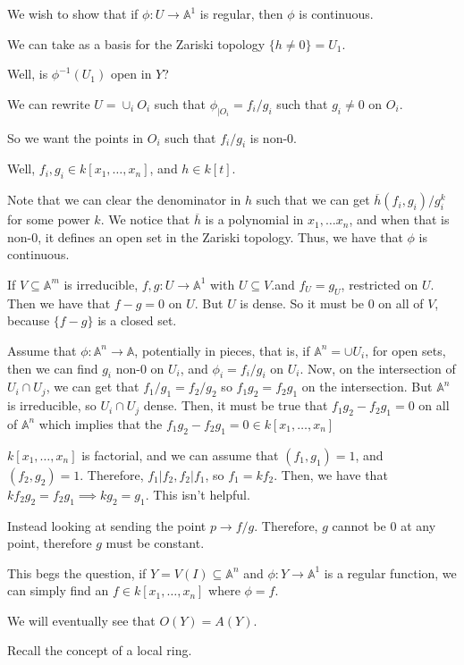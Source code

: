 \documentclass[10pt]{article}
\begin{document}
We wish to show that if $\phi: U \to \mathbb{A}^1$ is regular, then $\phi$ is continuous. 

We can take as a basis for the Zariski topology $\{ h \not = 0\} = U_1$.

Well, is $\phi^{-1}(U_1)$ open in $Y$?

We can rewrite $U = \cup_i O_i$ such that $\phi_{|O_i} = f_i/g_i$ such that $g_i \not = 0$ on $O_i$.

So we want the points in $O_i$ such that $f_i/g_i$ is non-0.

Well, $f_i,g_i \in k[x_1,…,x_n]$, and $h \in k[t]$.

Note that we can clear the denominator in $h$ such that we can get $\overline{h}(f_i,g_i)/g_i^k$ for some power $k$. We notice that $\overline{h}$ is a polynomial in $x_1,…x_n$, and when that is non-0, it defines an open set in the Zariski topology. Thus, we have that $\phi$ is continuous.

If $V \subseteq \mathbb{A}^m$ is irreducible, $f,g: U \to \mathbb{A}^1$ with $U \subseteq V$.and $f_{U} = g_{U}$, restricted on $U$. Then we have that $f-g = 0$ on $U$. But $U$ is dense. So it must be 0 on all of $V$, because $\{ f - g\}$ is a closed set.

Assume that $\phi: \mathbb{A}^n \to \mathbb{A}$, potentially in pieces, that is, if $\mathbb{A}^n = \cup U_i$, for open sets, then we can find $g_i$ non-0 on $U_i$, and $\phi_i = f_i/g_i$ on $U_i$. Now, on the intersection of $U_i \cap U_j$, we can get that $f_1/g_1 = f_2/g_2$ so $f_1g_2 = f_2g_1$ on the intersection. But $\mathbb{A}^n$ is irreducible, so $U_i \cap U_j$ dense. Then, it must be true that $f_1g_2 - f_2g_1 = 0$ on all of $\mathbb{A}^n$ which implies that the $f_1g_2 - f_2g_1 = 0 \in k[x_1,…,x_n]$

$k[x_1,…,x_n]$ is factorial, and we can assume that $(f_1,g_1) = 1$, and $(f_2,g_2) = 1$. Therefore, $f_1 | f_2, f_2 | f_1$, so $f_1 = kf_2$. Then, we have that $kf_2g_2 = f_2g_1 \implies kg_2 = g_1$. This isn’t helpful.

Instead looking at sending the point $p \to f/g$. Therefore, $g$ cannot be 0 at any point, therefore $g$ must be constant.

This begs the question, if $Y = V(I) \subseteq \mathbb{A}^n$ and $\phi: Y \to \mathbb{A}^1$ is a regular function, we can simply find an $f \in k[x_1,…,x_n]$ where $\phi = f$. 

We will eventually see that $O(Y) = A(Y)$.

Recall the concept of a local ring.
\end{document}
